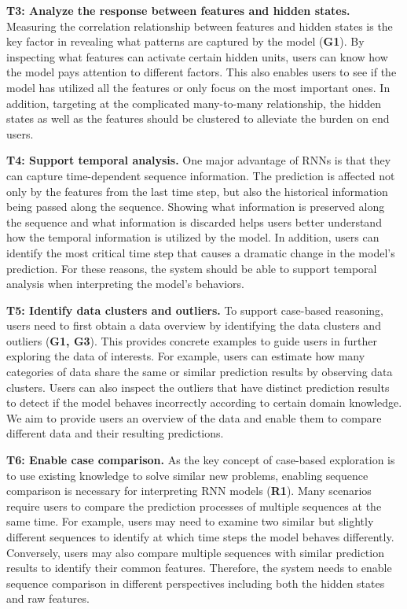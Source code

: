 \textbf{T3: Analyze the response between features and hidden states.}
Measuring the correlation relationship between features and hidden states is the key factor in revealing what patterns are captured by the model (\textbf{G1}). 
By inspecting what features can activate certain hidden units, users can know how the model pays attention to different factors. 
This also enables users to see if the model has utilized all the features or only focus on the most important ones. 
In addition, targeting at the complicated many-to-many relationship, the hidden states as well as the features should be clustered to alleviate the burden on end users. 


\textbf{T4: Support temporal analysis.}
One major advantage of RNNs is that they can capture time-dependent sequence information.
The prediction is affected not only by the features from the last time step, but also the historical information being passed along the sequence.
Showing what information is preserved along the sequence and what information is discarded helps users better understand how the temporal information is utilized by the model.
In addition, users can identify the most critical time step that causes a dramatic change in the model's prediction.
For these reasons, the system should be able to support temporal analysis when interpreting the model's behaviors.


\textbf{T5: Identify data clusters and outliers.}
To support case-based reasoning, users need to first obtain a data overview by identifying the data clusters and outliers (\textbf{G1, G3}).
This provides concrete examples to guide users in further exploring the data of interests.
For example, users can estimate how many categories of data share the same or similar prediction results by observing data clusters.
Users can also inspect the outliers that have distinct prediction results to detect if the model behaves incorrectly according to certain domain knowledge.
We aim to provide users an overview of the data and enable them to compare different data and their resulting predictions.

\textbf{T6: Enable case comparison.}
As the key concept of case-based exploration is to use existing knowledge to solve similar new problems, enabling sequence comparison is necessary for interpreting RNN models (\textbf{R1}). 
Many scenarios require users to compare the prediction processes of multiple sequences at the same time.
For example, users may need to examine two similar but slightly different sequences to identify at which time steps the model behaves differently.
Conversely, users may also compare multiple sequences with similar prediction results to identify their common features.
Therefore, the system needs to enable sequence comparison in different perspectives including both the hidden states and raw features.


